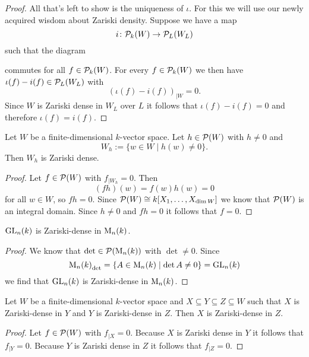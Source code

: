 \begin{proof}
 All that’s left to show is the uniqueness of $\iota$. For this we will use our newly acquired wisdom about Zariski density. Suppose we have a map
 \[
  i \colon \mathcal{P}_k(W) \to \mathcal{P}_L(W_L)
 \]
 such that the diagram
  \begin{center}
 \end{center}
 commutes for all $f \in \mathcal{P}_k(W)$. For every $f \in \mathcal{P}_k(W)$ we then have $\iota(f)-i(f) \in \mathcal{P}_L(W_L)$ with
 \[
  \left( \iota(f)-i(f) \right)_{|W} = 0.
 \]
 Since $W$ is Zariski dense in $W_L$ over $L$ it follows that $\iota(f) - i(f) = 0$ and therefore $\iota(f) = i(f)$.
\end{proof}


\begin{lem}
 Let $W$ be a finite-dimensional $k$-vector space. Let $h \in \mathcal{P}(W)$ with $h \neq 0$ and
 \[
  W_h := \{w \in W \mid h(w) \neq 0\}.
 \]
 Then $W_h$ is Zariski dense.
\end{lem}
\begin{proof}
 Let $f \in \mathcal{P}(W)$ with $f_{|W_h} = 0$. Then
 \[
  (fh)(w) = f(w)h(w) = 0
 \]
 for all $w \in W$, so $fh = 0$. Since $\mathcal{P}(W) \cong k[X_1, \dotsc, X_{\dim W}]$ we know that $\mathcal{P}(W)$ is an integral domain. Since $h \neq 0$ and $fh = 0$ it follows that $f = 0$.
\end{proof}


\begin{cor}
 $\operatorname{GL}_n(k)$ is Zariski-dense in $\operatorname{M}_n(k)$.
\end{cor}
\begin{proof}
 We know that $\det \in \mathcal{P}(\operatorname{M}_n(k))$ with $\det \neq 0$. Since
 \[
  {\operatorname{M}_n(k)}_{\det} = \{A \in \operatorname{M}_n(k) \mid \det A \neq 0\} = \operatorname{GL}_n(k)
 \]
 we find that $\operatorname{GL}_n(k)$ is Zariski-dense in $\operatorname{M}_n(k)$.
\end{proof}


\begin{prop}
 Let $W$ be a finite-dimensional $k$-vector space and $X \subseteq Y \subseteq Z \subseteq W$ such that $X$ is Zariski-dense in $Y$ and $Y$ is Zariski-dense in $Z$. Then $X$ is Zariski-dense in $Z$.
\end{prop}
\begin{proof}
 Let $f \in \mathcal{P}(W)$ with $f_{|X} = 0$. Because $X$ is Zariski dense in $Y$ it follows that $f_{|Y} = 0$. Because $Y$ is Zariski dense in $Z$ it follows that $f_{|Z} = 0$.
\end{proof}


